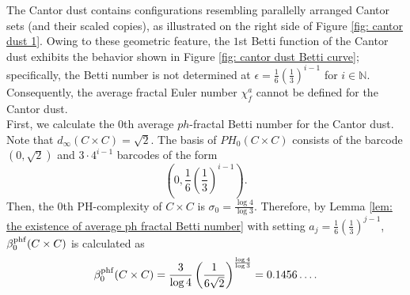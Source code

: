 \documentclass[12pt]{amsart}
\numberwithin{equation}{section}
\newcommand{\N}{\mathbb{N}}
\begin{document}
    The Cantor dust contains configurations resembling parallelly arranged Cantor sets (and their scaled copies), as illustrated on the right side of Figure \ref{fig: cantor dust 1}. 
    Owing to these geometric feature, the $1$st Betti function of the Cantor dust exhibits the behavior shown in Figure \ref{fig: cantor dust Betti curve}; 
    specifically, the Betti number is not determined at $\epsilon = \frac{1}{6}\left(\frac{1}{3}\right)^{i-1}$ for $i \in \N$. 
    Consequently, the average fractal Euler number $\chi_f^a$ cannot be defined for the Cantor dust.\\
    \indent
    First, we calculate the $0$th average $ph$-fractal Betti number for the Cantor dust. 
    Note that $d_\infty (C\times C) = \sqrt{2}$. 
    The basis of $PH_0 (C \times C)$ consists of the barcode $\left(0,\sqrt{2}\right)$ and $3\cdot4^{i-1}$ barcodes of the form
    \begin{equation*}
    \left( 0, \frac{1}{6} \left( \frac{1}{3}\right)^{i-1}\right).
    \end{equation*}
    Then, the $0$th PH-complexity of $C \times C$ is $\sigma_0 = \frac{\log 4}{\log 3}$. 
    Therefore, by Lemma \ref{lem: the existence of average ph fractal Betti number} with setting $a_j = \frac{1}{6}\left(\frac{1}{3}\right)^{j-1}$, $\beta_0^{\rm phf} (C \times C)$ is calculated as
    \begin{equation}
        \beta_0 ^{\rm phf} (C \times C) = \frac{3}{\log 4}\left(\frac{1}{6\sqrt{2}}\right)^{\frac{\log 4}{\log 3}} = 0.1456\dots.
        \label{eq: cantor dust 0th}
    \end{equation} 
\end{document}
